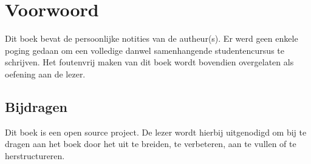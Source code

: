 \documentclass[main.tex]{subfiles}
\begin{document}
\section*{Voorwoord}
Dit boek bevat de persoonlijke notities van de autheur(s).
Er werd geen enkele poging gedaan om een volledige danwel samenhangende studentencursus te schrijven.
Het foutenvrij maken van dit boek wordt bovendien overgelaten als oefening aan de lezer.

\subsection*{Bijdragen}
Dit boek is een open source project.
De lezer wordt hierbij uitgenodigd om bij te dragen aan het boek door het uit te breiden, te verbeteren, aan te vullen of te herstructureren.
\end{document}
